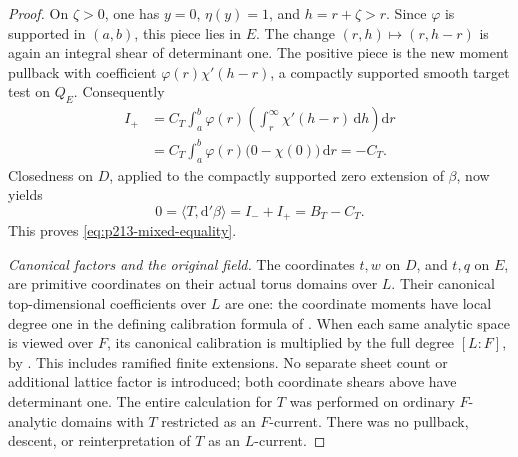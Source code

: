 \begin{proof}
On \(\zeta>0\), one has \(y=0\), \(\eta(y)=1\),
and \(h=r+\zeta>r\). Since \(\varphi\) is supported
in \((a,b)\), this piece lies in \(E\).
The change \((r,h)\mapsto(r,h-r)\) is again an
integral shear of determinant one. The positive
piece is the new moment pullback with coefficient
\(\varphi(r)\chi'(h-r)\), a compactly supported
smooth target test on \(Q_E\). Consequently
\[
 \begin{split}
 I_+&=C_T\int_a^b\varphi(r)
       \left(\int_r^\infty\chi'(h-r)\,\mathrm dh\right)
                        \mathrm dr\\
    &=C_T\int_a^b\varphi(r)
                 \bigl(0-\chi(0)\bigr)\,\mathrm dr
      =-C_T .
 \end{split}
\]
Closedness on \(D\), applied to the compactly supported
zero extension of \(\beta\), now yields
\[
        0=\langle T,\mathrm d'\beta\rangle
                       =I_-+I_+=B_T-C_T.
\]
This proves \eqref{eq:p213-mixed-equality}.

\emph{Canonical factors and the original field.}
The coordinates \(t,w\) on \(D\), and \(t,q\) on \(E\),
are primitive coordinates on their actual torus
domains over \(L\). Their canonical top-dimensional
coefficients over \(L\) are one: the coordinate moments
have local degree one in the defining calibration
formula of \cite[Section 14.3.2, p.~407]{CLD25}.
When each same analytic space is viewed over \(F\),
its canonical calibration is multiplied by the full
degree \([L:F]\), by
\cite[Remark 14.4.3, p.~410]{CLD25}.
This includes ramified finite extensions. No separate
sheet count or additional lattice factor is introduced;
both coordinate shears above have determinant one.
The entire calculation for \(T\) was performed on
ordinary \(F\)-analytic domains with \(T\) restricted
as an \(F\)-current. There was no pullback, descent, or
reinterpretation of \(T\) as an \(L\)-current.
\end{proof}
